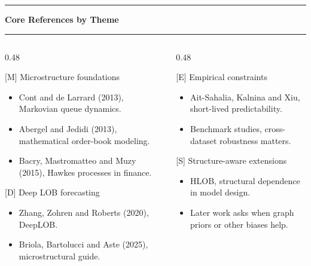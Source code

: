 \documentclass[aspectratio=169,10pt]{beamer}
\newcommand{\tightitems}{\setlength{\itemsep}{0.35em}}
\newcommand{\contentheader}[1]{%
  \vspace*{0.05em}%
  {\noindent\color{BrandOrange}\rule{0.42em}{0.42em}\hspace{0.50em}\bfseries\Large #1\par}%
  \vspace{0.15em}%
  {\color{BrandOrange}\rule{\textwidth}{1.4pt}\par}%
  \vspace{0.42em}%
}
\begin{document}
\begin{frame}[plain]
\contentheader{Core References by Theme}
\scriptsize
\begin{columns}[T,totalwidth=\textwidth]
\begin{column}{0.48\textwidth}
\begin{block}{[M] Microstructure foundations}
\begin{itemize}\tightitems
  \item [M1] Cont and de Larrard (2013), Markovian queue dynamics.
  \item [M2] Abergel and Jedidi (2013), mathematical order-book modeling.
  \item [M3] Bacry, Mastromatteo and Muzy (2015), Hawkes processes in finance.
\end{itemize}
\end{block}
\begin{block}{[D] Deep LOB forecasting}
\begin{itemize}\tightitems
  \item [D1] Zhang, Zohren and Roberts (2020), DeepLOB.
  \item [D2] Briola, Bartolucci and Aste (2025), microstructural guide.
\end{itemize}
\end{block}
\end{column}
\begin{column}{0.48\textwidth}
\begin{block}{[E] Empirical constraints}
\begin{itemize}\tightitems
  \item [E1] Ait-Sahalia, Kalnina and Xiu, short-lived predictability.
  \item [E2] Benchmark studies, cross-dataset robustness matters.
\end{itemize}
\end{block}
\begin{block}{[S] Structure-aware extensions}
\begin{itemize}\tightitems
  \item [S1] HLOB, structural dependence in model design.
  \item [S2] Later work asks when graph priors or other biases help.
\end{itemize}
\end{block}
\end{column}
\end{columns}
\end{frame}
\end{document}

